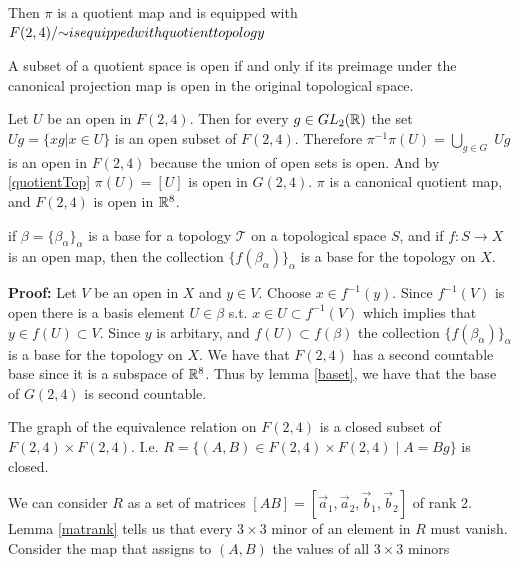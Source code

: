 \documentclass[11pt,a4paper]{report}
\begin{document}
Then $\pi$ is a quotient map and is equipped with $F(2,4)/{\sim} is equipped with quotient topology$
\newline
\begin{Lemma} \label{quotientTop}
    A subset of a quotient space is open if and only if its
    preimage under the canonical projection map is open in the original topological space.
\end{Lemma}
Let $U$ be an open in $F(2,4)$. Then for every $g \in GL_2(\mathbb{R})$ the set $U g = \{ x g | x \in U \}$ is an open subset of $F(2,4)$.
Therefore $\pi^{-1}\pi(U) = \displaystyle \bigcup_{g \in G} \; U g$ is an open in $F(2,4)$ because the union of open sets is open.
And by \ref{quotientTop} $\pi(U) = [U]$ is open in $G(2,4)$. $\pi$ is a canonical quotient map, and $F(2,4)$ is open in $\mathbb{R}^8$. 
\newline
\newline
\begin{Lemma}
    \label{baset}
    if $\beta = \{ \beta_\alpha \}_\alpha$ is a base for a topology $\mathcal{T}$ on a topological space $S$,
    and if $f: S \to X$ is an open map, then the collection $\{ f (\beta_\alpha) \}_\alpha$ is a base for the topology on $X$.
\end{Lemma}
\textbf{Proof:} Let $V$ be an open in $X$ and $y \in V$. Choose $x \in f^{-1}(y)$. 
Since $f^{-1} (V)$ is open there is a basis element $U \in \beta$ s.t. $x \in U \subset f^{-1}(V)$
which implies that $y \in f(U) \subset V$. Since $y$ is arbitary, and $f(U) \subset f(\beta)$ the collection $\{ f (\beta_\alpha) \}_\alpha$ is a base for the topology on $X$.
\newline
\newline
We have that $F(2,4)$ has a second countable base since it is a subspace of $\mathbb{R}^8$.
Thus by lemma \ref{baset}, we have that the base of $G(2,4)$ is second countable.
\newline
\newline
\begin{Prop}
The graph of the equivalence relation on $F(2,4)$ is a closed subset of $F(2,4) \times F(2,4)$. \newline
I.e. $ R = \{ (A,B) \in F(2,4) \times F(2,4) \; | \; A = Bg \}$ is closed.
\end{Prop}
We can consider $R$ as a set of matrices $[A B] = [\vec{a}_1, \vec{a}_2, \vec{b}_1, \vec{b}_2]$ of rank 2.
Lemma \ref{matrank} tells us that every $3 \times 3$ minor of an element in $R$ must vanish. Consider the map that assigns to $(A,B)$ the values of all $3 \times 3$ minors
\end{document}
